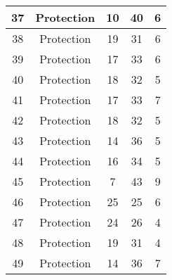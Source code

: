 \documentclass[results.tex]{subfiles}
\begin{document}
\begin{center}
\begin{tabular}{| c || c | c | c | c |}
            \hline
            37                      & Protection                   & 10                     & 40                      & 6                    \\
            \hline
            38                      & Protection                   & 19                     & 31                      & 6                    \\
            \hline
            39                      & Protection                   & 17                     & 33                      & 6                    \\
            \hline
            40                      & Protection                   & 18                     & 32                      & 5                    \\
            \hline
            41                      & Protection                   & 17                     & 33                      & 7                    \\
            \hline
            42                      & Protection                   & 18                     & 32                      & 5                    \\
            \hline
            43                      & Protection                   & 14                     & 36                      & 5                    \\
            \hline
            44                      & Protection                   & 16                     & 34                      & 5                    \\
            \hline
            45                      & Protection                   & 7                      & 43                      & 9                    \\
            \hline
            46                      & Protection                   & 25                     & 25                      & 6                    \\
            \hline
            47                      & Protection                   & 24                     & 26                      & 4                    \\
            \hline
            48                      & Protection                   & 19                     & 31                      & 4                    \\
            \hline
            49                      & Protection                   & 14                     & 36                      & 7                    \\
            \hline
        \end{tabular}
    \end{center}
\end{document}
